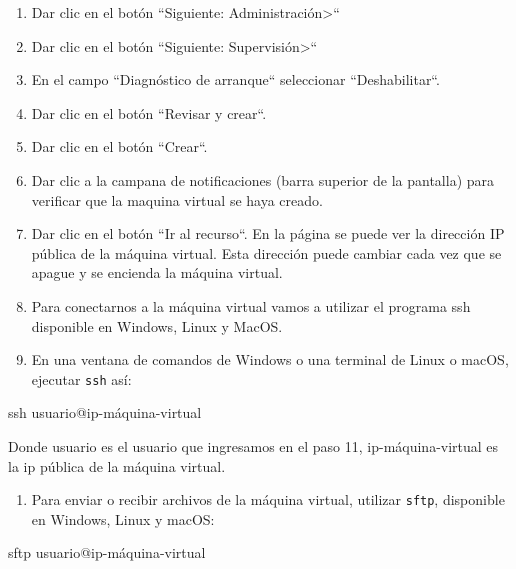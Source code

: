 \begin{enumerate}

\item Dar clic en el botón ``Siguiente: Administración>``

\item Dar clic en el botón ``Siguiente: Supervisión>``

\item En el campo ``Diagnóstico de arranque`` seleccionar ``Deshabilitar``.

\item Dar clic en el botón ``Revisar y crear``.

\item Dar clic en el botón ``Crear``.

\item Dar clic a la campana de notificaciones (barra superior de la pantalla) para verificar que la maquina virtual se haya creado.

\item Dar clic en el botón ``Ir al recurso``. En la página se puede ver la dirección IP pública de la máquina virtual. Esta dirección puede cambiar cada vez que se apague y se encienda la máquina virtual.

\item Para conectarnos a la máquina virtual vamos a utilizar el programa ssh disponible en Windows, Linux y MacOS.

\item En una ventana de comandos de Windows o una terminal de Linux o macOS, ejecutar \texttt{ssh} así:

\end{enumerate}

\begin{SourceCode}
ssh usuario@ip-máquina-virtual
\end{SourceCode}

Donde usuario es el usuario que ingresamos en el paso 11, ip-máquina-virtual es la ip pública de la máquina virtual.

\begin{enumerate}

\item Para enviar o recibir archivos de la máquina virtual, utilizar \texttt{sftp}, disponible en Windows, Linux y macOS:

\end{enumerate}

\begin{SourceCode}
sftp usuario@ip-máquina-virtual
\end{SourceCode}

